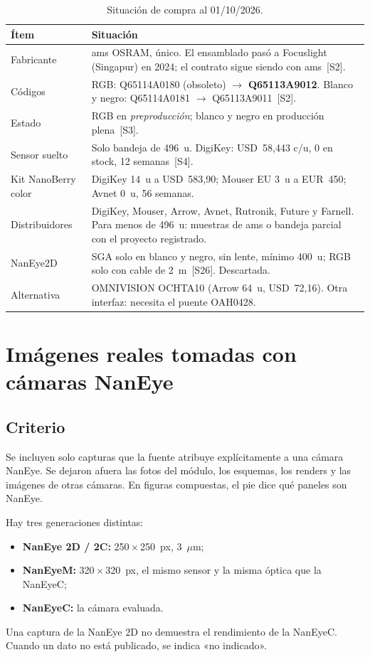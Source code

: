 \documentclass[11pt,a4paper]{article}
\begin{document}
\begin{table}[H]\centering
\caption{Situación de compra al 01/10/2026.}
\small
\begin{tabularx}{\linewidth}{l X}
\toprule
Ítem & Situación \\
\midrule
Fabricante & ams OSRAM, único. El ensamblado pasó a Focuslight (Singapur) en 2024; el contrato sigue siendo con ams~[S2]. \\
Códigos & RGB: Q65114A0180 (obsoleto) $\rightarrow$ \textbf{Q65113A9012}. Blanco y negro: Q65114A0181 $\rightarrow$ Q65113A9011~[S2]. \\
Estado & RGB en \emph{preproducción}; blanco y negro en producción plena~[S3]. \\
Sensor suelto & Solo bandeja de 496~u. DigiKey: USD~58,443 c/u, 0 en stock, 12 semanas~[S4]. \\
Kit NanoBerry color & DigiKey 14~u a USD~583,90; Mouser EU 3~u a EUR~450; Avnet 0~u, 56 semanas. \\
Distribuidores & DigiKey, Mouser, Arrow, Avnet, Rutronik, Future y Farnell. Para menos de 496~u: muestras de ams o bandeja parcial con el proyecto registrado. \\
NanEye2D & SGA solo en blanco y negro, sin lente, mínimo 400~u; RGB solo con cable de 2~m~[S26]. Descartada. \\
Alternativa & OMNIVISION OCHTA10 (Arrow 64~u, USD~72,16). Otra interfaz: necesita el puente OAH0428. \\
\bottomrule
\end{tabularx}
\end{table}

\section{Imágenes reales tomadas con cámaras NanEye}

\subsection{Criterio}
Se incluyen solo capturas que la fuente atribuye explícitamente a una cámara NanEye. Se dejaron afuera las fotos del módulo, los esquemas, los renders y las imágenes de otras cámaras. En figuras compuestas, el pie dice qué paneles son NanEye.

Hay tres generaciones distintas:
\begin{itemize}
  \item \textbf{NanEye 2D / 2C:} 250\,$\times$\,250~px, 3~$\mu$m;
  \item \textbf{NanEyeM:} 320\,$\times$\,320~px, el mismo sensor y la misma óptica que la NanEyeC;
  \item \textbf{NanEyeC:} la cámara evaluada.
\end{itemize}
Una captura de la NanEye 2D no demuestra el rendimiento de la NanEyeC. Cuando un dato no está publicado, se indica «no indicado».
\end{document}
